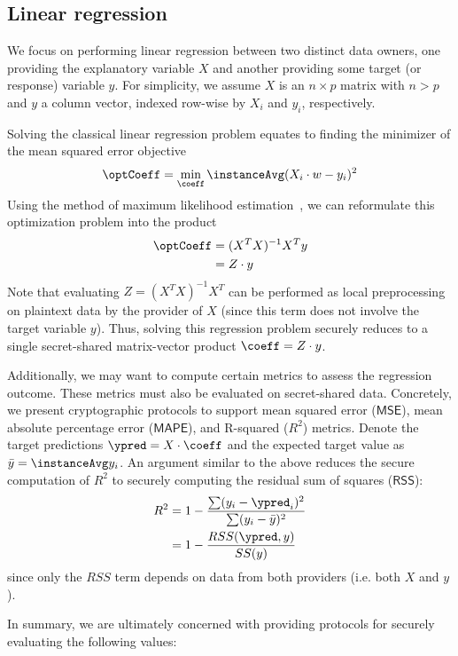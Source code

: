 
\subsection{Linear regression}
\label{sec:linreg}

We focus on performing linear regression between two distinct data owners, one providing the explanatory variable $X$ and another providing some target (or response) variable $y$. For simplicity, we assume $X$ is an $n \times p$ matrix with $n > p$ and $y$ a column vector, indexed row-wise by $X_i$ and $y_i$, respectively.

Solving the classical linear regression problem equates to finding the minimizer of the mean squared error objective
\begin{align*}
\optCoeff = \min_{\coeff}\instanceAvg (X_i \cdot w - y_i)^2
\end{align*}
Using the method of maximum likelihood estimation~\cite{mml}, we can reformulate this optimization problem into the product
\begin{align*}
\optCoeff &= (X^TX)^{-1}X^Ty
\\
&= Z \cdot y
\end{align*}
Note that evaluating $Z = (X^TX)^{-1}X^T$ can be performed as local preprocessing on plaintext data by the provider of $X$ (since this term does not involve the target variable $y$). Thus, solving this regression problem securely reduces to a single secret-shared matrix-vector product $\coeff = Z \cdot y$.

Additionally, we may want to compute certain metrics to assess the regression
outcome. These metrics must also be evaluated on secret-shared data. Concretely,
we present cryptographic protocols to support mean squared error
($\mathsf{MSE}$), mean absolute percentage error
($\mathsf{MAPE}$), and R-squared ($R^2$) metrics. Denote the target predictions $\ypred = X \cdot
\coeff$ and the expected target value as $\bar{y} = \instanceAvg y_i$. An
argument similar to the above reduces the secure computation of $R^2$ to
securely computing the residual sum of squares ($\mathsf{RSS}$):
\begin{align*}
R^2 &= 1 - \frac{\sum(y_i - \ypred_i)^2}{\sum(y_i - \bar{y})^2}
\\
&= 1 - \frac{RSS(\ypred, y)}{SS(y)}
\end{align*}
since only the $RSS$ term depends on data from both providers (i.e. both $X$ and $y$).

In summary, we are ultimately concerned with providing protocols for securely evaluating the following values:

